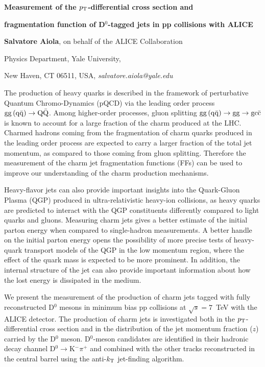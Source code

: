 \documentclass[12pt]{article}
\begin{document}
\centerline{\bf 
Measurement of the $p_{\rm T}$-differential cross section and
}

\centerline{\bf 
fragmentation function of D$^0$-tagged jets in pp collisions with ALICE
}

\vspace{12pt}

\centerline{ {\bf Salvatore Aiola}, on behalf of the ALICE Collaboration }

\vspace{12pt}

\centerline{Physics Department, Yale University,
}\centerline{New Haven, CT 06511, USA, {\it salvatore.aiola@yale.edu}}

\vspace{12pt}


\vspace{12pt} \vspace{12pt}

The production of heavy quarks is described in the framework of perturbative Quantum Chromo-Dynamics (pQCD) via the leading order process ${\rm gg\, (q\bar{q})} \rightarrow {\rm Q\bar{Q}}$.
Among higher-order processes, gluon splitting ${\rm gg\, (q\bar{q})} \rightarrow {\rm gg} \rightarrow \rm gc\bar{c}$
is known to account for a large fraction of the charm produced at the LHC.
Charmed hadrons coming from the fragmentation of charm quarks
produced in the leading order process
are expected to carry a larger fraction of the total jet momentum,
as compared to those coming from gluon splitting.
Therefore the measurement of the charm jet fragmentation functions (FFs) 
can be used to improve our understanding of the charm production mechanisms.

Heavy-flavor jets can also provide important insights into the Quark-Gluon Plasma (QGP)
produced in ultra-relativistic heavy-ion collisions, as heavy quarks are predicted
to interact with the QGP constituents differently compared to light quarks and gluons. 
Measuring charm jets gives a better estimate of the initial parton energy
when compared to single-hadron measurements.
A better handle on the initial parton energy opens the possibility of more precise tests of 
heavy-quark transport models of the QGP in the low momentum region,
where the effect of the quark mass is expected to be more prominent.
In addition, the internal structure of the jet can also provide important information
about how the lost energy is dissipated in the medium.

We present the measurement of the production of charm jets tagged with fully reconstructed D$^0$ mesons in minimum bias pp collisions at $\sqrt{s} = 7$~TeV with the ALICE detector. 
The production of charm jets is investigated both in the $p_{\rm T}$-differential cross section and in the distribution of the jet momentum fraction ($z$) carried by the D$^0$ meson.
D$^0$-meson candidates are identified in their hadronic decay channel D$^0\rightarrow$K$^{-}\pi^{+}$ and combined with the other tracks reconstructed in the central barrel using the anti-$k_{\rm T}$ jet-finding algorithm.
\end{document}
